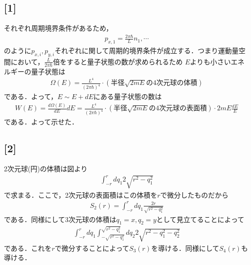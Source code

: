 \documentclass[12pt,dvipdfmx]{jsarticle}
\begin{document}
\subsection*{\large{[1]}}
それぞれ周期境界条件があるため，
\begin{eqnarray}
  p_{x,1} = \frac{2\pi\hbar}{L}n_1,\cdots
\end{eqnarray}
のように$p_{x,i},p_{y,i}$それぞれに関して周期的境界条件が成立する．つまり運動量空間において，$\frac{L}{2\pi\hbar}$倍をすると量子状態の数が求められるため
$E$よりも小さいエネルギーの量子状態は
\begin{eqnarray}
  \Omega(E)=\frac{L^{4}}{(2\pi\hbar)^4}\cdot (半径\sqrt{2mE}の4次元球の体積)
\end{eqnarray}
である．よって，$E\sim E+dE$にある量子状態の数は
\begin{eqnarray}
  W(E) = \frac{d\Omega(E)}{dE}dE = \frac{L^{4}}{(2\pi\hbar)^4}\cdot (半径\sqrt{2mE}の4次元球の表面積)\cdot 2mE \frac{dE}{E}
\end{eqnarray}
である．よって示せた．
\subsection*{\large{[2]}}
2次元球(円)の体積は図より
\begin{eqnarray}
  \int_{-r}^{r} dq_1 2\sqrt{r^2-q_1^2}
\end{eqnarray}
で求まる．ここで，2次元球の表面積はこの体積を$r$で微分したものだから
\begin{eqnarray}
  S_2(r) = \int_{-r}^{r} dq_1 \frac{2r}{\sqrt{r^2-q_1^2}}
\end{eqnarray}
である．同様にして3次元球の体積は$q_1=x,q_2=y$として見立てることによって
\begin{eqnarray}
  \int_{-r}^{r}dq_1 \int_{-\sqrt{r^2-q_1^2}}^{\sqrt{r^2-q_1^2}}dq_2 2\sqrt{r^2-q_1^2-q_2^2}
\end{eqnarray}
である．これを$r$で微分することによって$S_3(r)$を導ける．同様にして$S_4(r)$も導ける．
\end{document}
